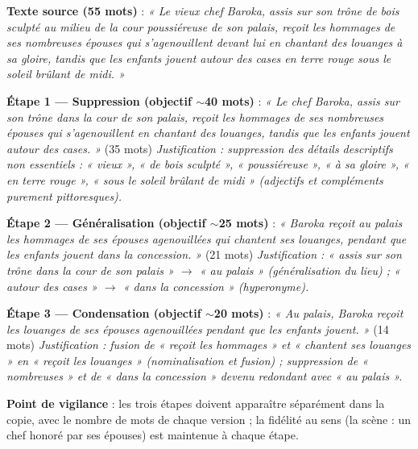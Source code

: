 \documentclass[11pt]{article}
\begin{document}
\begin{corrige}
\textbf{Texte source (55 mots)} : \emph{« Le vieux chef Baroka, assis sur son trône de bois sculpté au milieu de la cour poussiéreuse de son palais, reçoit les hommages de ses nombreuses épouses qui s'agenouillent devant lui en chantant des louanges à sa gloire, tandis que les enfants jouent autour des cases en terre rouge sous le soleil brûlant de midi. »}

\textbf{Étape 1 — Suppression (objectif $\sim$40 mots)} :
\emph{« Le chef Baroka, assis sur son trône dans la cour de son palais, reçoit les hommages de ses nombreuses épouses qui s'agenouillent en chantant des louanges, tandis que les enfants jouent autour des cases. »} (35 mots)
\textit{Justification : suppression des détails descriptifs non essentiels : « vieux », « de bois sculpté », « poussiéreuse », « à sa gloire », « en terre rouge », « sous le soleil brûlant de midi » (adjectifs et compléments purement pittoresques).}

\textbf{Étape 2 — Généralisation (objectif $\sim$25 mots)} :
\emph{« Baroka reçoit au palais les hommages de ses épouses agenouillées qui chantent ses louanges, pendant que les enfants jouent dans la concession. »} (21 mots)
\textit{Justification : « assis sur son trône dans la cour de son palais » $\rightarrow$ « au palais » (généralisation du lieu) ; « autour des cases » $\rightarrow$ « dans la concession » (hyperonyme).}

\textbf{Étape 3 — Condensation (objectif $\sim$20 mots)} :
\emph{« Au palais, Baroka reçoit les louanges de ses épouses agenouillées pendant que les enfants jouent. »} (14 mots)
\textit{Justification : fusion de « reçoit les hommages » et « chantent ses louanges » en « reçoit les louanges » (nominalisation et fusion) ; suppression de « nombreuses » et de « dans la concession » devenu redondant avec « au palais ».}

\textbf{Point de vigilance} : les trois étapes doivent apparaître séparément dans la copie, avec le nombre de mots de chaque version ; la fidélité au sens (la scène : un chef honoré par ses épouses) est maintenue à chaque étape.
\end{corrige}
\end{document}
